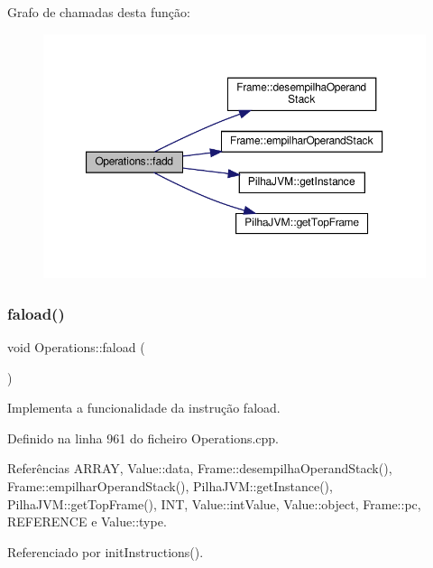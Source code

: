 Grafo de chamadas desta função\+:
\nopagebreak
\begin{figure}[H]
\begin{center}
\leavevmode
\includegraphics[width=350pt]{classOperations_a01a07c700f0f1574552437b76f3fdcb4_cgraph}
\end{center}
\end{figure}
\mbox{\label{classOperations_ac22c02d88fa894cafd3f53c54d91409d}} 
\subsubsection{\texorpdfstring{faload()}{faload()}}
{\footnotesize\ttfamily void Operations\+::faload (\begin{DoxyParamCaption}{ }\end{DoxyParamCaption})\hspace{0.3cm}{\ttfamily [private]}}



Implementa a funcionalidade da instrução faload. 



Definido na linha 961 do ficheiro Operations.\+cpp.



Referências A\+R\+R\+AY, Value\+::data, Frame\+::desempilha\+Operand\+Stack(), Frame\+::empilhar\+Operand\+Stack(), Pilha\+J\+V\+M\+::get\+Instance(), Pilha\+J\+V\+M\+::get\+Top\+Frame(), I\+NT, Value\+::int\+Value, Value\+::object, Frame\+::pc, R\+E\+F\+E\+R\+E\+N\+CE e Value\+::type.



Referenciado por init\+Instructions().

